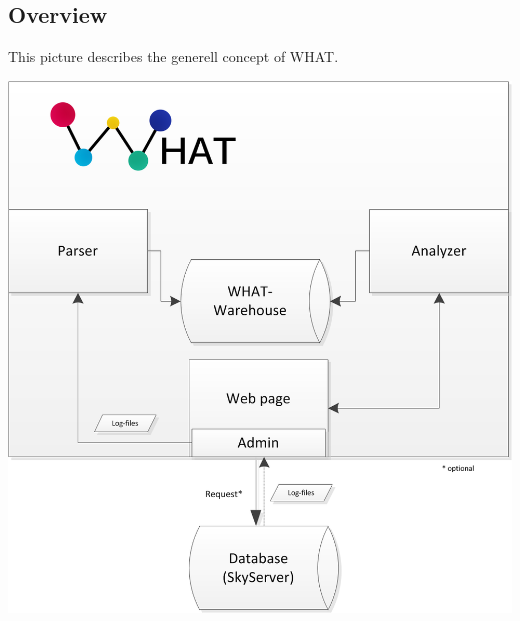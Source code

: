 \subsection{Overview}\label{overview}
This picture describes the generell concept of WHAT.
\begin{center}
\includegraphics[width=1\linewidth]{Pictures/GenerellConcept.png}
\end{center} 
% 


